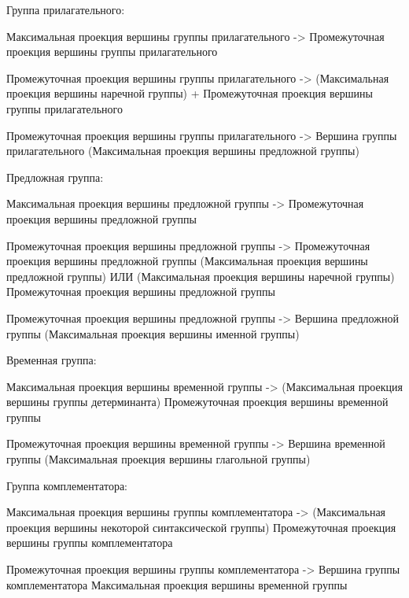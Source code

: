 Группа прилагательного:
\begin{textitemize}
    \item Максимальная проекция вершины группы прилагательного -> Промежуточная проекция вершины группы прилагательного
    \item Промежуточная проекция вершины группы прилагательного -> (Максимальная проекция вершины наречной группы) + Промежуточная проекция вершины группы прилагательного
    \item Промежуточная проекция вершины группы прилагательного -> Вершина группы прилагательного (Максимальная проекция вершины предложной группы)
\end{textitemize}

Предложная группа:
\begin{textitemize}
    \item Максимальная проекция вершины предложной группы -> Промежуточная проекция вершины предложной группы
    \item Промежуточная проекция вершины предложной группы -> Промежуточная проекция вершины предложной группы (Максимальная проекция вершины предложной группы) ИЛИ (Максимальная проекция вершины наречной группы) Промежуточная проекция вершины предложной группы
    \item Промежуточная проекция вершины предложной группы -> Вершина предложной группы (Максимальная проекция вершины именной группы)
\end{textitemize}

Временная группа:
\begin{textitemize}
    \item Максимальная проекция вершины временной группы -> (Максимальная проекция вершины группы детерминанта) Промежуточная проекция вершины временной группы
    \item Промежуточная проекция вершины временной группы -> Вершина временной группы (Максимальная проекция вершины глагольной группы)
\end{textitemize}

Группа комплементатора:
\begin{textitemize}
    \item Максимальная проекция вершины группы комплементатора -> (Максимальная проекция вершины некоторой синтаксической группы) Промежуточная проекция вершины группы комплементатора
    \item Промежуточная проекция вершины группы комплементатора -> Вершина группы комплементатора Максимальная проекция вершины временной группы
\end{textitemize}

